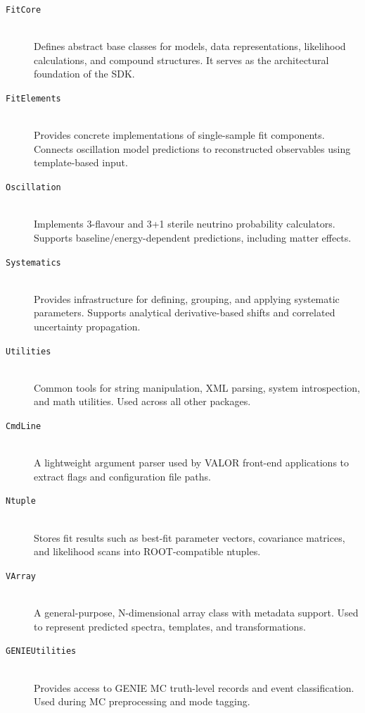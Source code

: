 \begin{description}

  \item[\texttt{FitCore}] \hfill \\
  Defines abstract base classes for models, data representations, likelihood calculations, and compound structures.
  It serves as the architectural foundation of the SDK.

  \item[\texttt{FitElements}] \hfill \\
  Provides concrete implementations of single-sample fit components.
  Connects oscillation model predictions to reconstructed observables using template-based input.

  \item[\texttt{Oscillation}] \hfill \\
  Implements 3-flavour and 3+1 sterile neutrino probability calculators.
  Supports baseline/energy-dependent predictions, including matter effects.

  \item[\texttt{Systematics}] \hfill \\
  Provides infrastructure for defining, grouping, and applying systematic parameters.
  Supports analytical derivative-based shifts and correlated uncertainty propagation.

  \item[\texttt{Utilities}] \hfill \\
  Common tools for string manipulation, XML parsing, system introspection, and math utilities.
  Used across all other packages.

  \item[\texttt{CmdLine}] \hfill \\
  A lightweight argument parser used by VALOR front-end applications to extract flags and configuration file paths.

  \item[\texttt{Ntuple}] \hfill \\
  Stores fit results such as best-fit parameter vectors, covariance matrices, and likelihood scans into ROOT-compatible ntuples.

  \item[\texttt{VArray}] \hfill \\
  A general-purpose, N-dimensional array class with metadata support.
  Used to represent predicted spectra, templates, and transformations.

  \item[\texttt{GENIEUtilities}] \hfill \\
  Provides access to GENIE MC truth-level records and event classification.
  Used during MC preprocessing and mode tagging.


\end{description}
